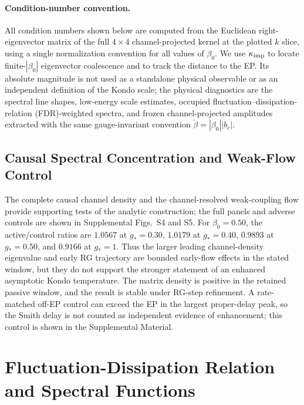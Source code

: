 \documentclass[%
  aps,prb,reprint,amsmath,amssymb,superscriptaddress,longbibliography,floatfix
]{revtex4-2}
\newcommand{\keff}{\kappa_{\rm imp}}
\newcommand{\tb}{\tilde{\beta}}          %
\newcommand{\gb}{\beta_0}               %
\begin{document}
\paragraph{Condition-number convention.}
All condition numbers shown below are computed from the Euclidean
right-eigenvector matrix of the full $4\times4$ channel-projected
kernel at the plotted $k$ slice, using a single normalization
convention for all values of \(\gb\).  We use
\(\keff\) to locate finite-\(|\gb|\) eigenvector coalescence and to
track the distance to the EP.  Its absolute magnitude is not used as a
standalone physical observable or as an independent definition of the
Kondo scale; the physical diagnostics are the spectral line shapes,
low-energy scale estimates, occupied fluctuation--dissipation-relation (FDR)-weighted spectra, and frozen
channel-projected amplitudes extracted with the same gauge-invariant
convention \(\tb=|\gb||b_c|\).

\subsection{Causal Spectral Concentration and Weak-Flow Control}

The complete causal channel density and the channel-resolved weak-coupling
flow provide supporting tests of the analytic construction; the full panels
and adverse controls are shown in Supplemental Figs.~S4 and S5.  For
$\beta_0=0.50$, the active/control ratios are $1.0567$ at $g_\ast=0.30$,
$1.0179$ at $g_\ast=0.40$, $0.9893$ at $g_\ast=0.50$, and $0.9166$ at
$g_\ast=1$.  Thus the larger leading channel-density eigenvalue and early RG
trajectory are bounded early-flow effects in the stated window, but they do not
support the stronger statement of an enhanced asymptotic Kondo temperature.
The matrix density is positive in the retained
passive window, and the result is stable under RG-step refinement.  A
rate-matched off-EP control can exceed the EP in the largest proper-delay
peak, so the Smith delay is not counted as independent evidence of
enhancement; this control is shown in the Supplemental Material.

\section{Fluctuation-Dissipation Relation and Spectral Functions}
\label{sec:FDR}
\end{document}
